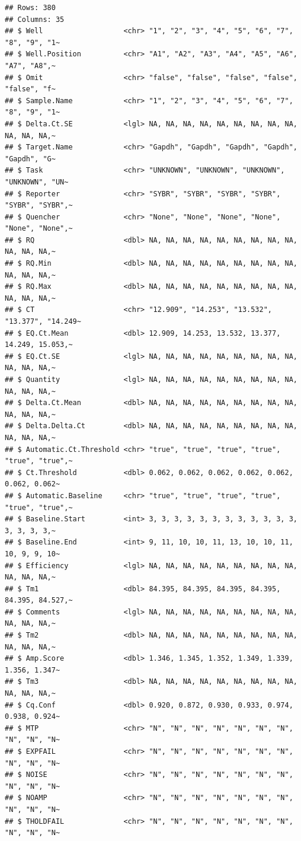 \documentclass[
]{book}
\begin{document}
\begin{verbatim}
## Rows: 380
## Columns: 35
## $ Well                   <chr> "1", "2", "3", "4", "5", "6", "7", "8", "9", "1~
## $ Well.Position          <chr> "A1", "A2", "A3", "A4", "A5", "A6", "A7", "A8",~
## $ Omit                   <chr> "false", "false", "false", "false", "false", "f~
## $ Sample.Name            <chr> "1", "2", "3", "4", "5", "6", "7", "8", "9", "1~
## $ Delta.Ct.SE            <lgl> NA, NA, NA, NA, NA, NA, NA, NA, NA, NA, NA, NA,~
## $ Target.Name            <chr> "Gapdh", "Gapdh", "Gapdh", "Gapdh", "Gapdh", "G~
## $ Task                   <chr> "UNKNOWN", "UNKNOWN", "UNKNOWN", "UNKNOWN", "UN~
## $ Reporter               <chr> "SYBR", "SYBR", "SYBR", "SYBR", "SYBR", "SYBR",~
## $ Quencher               <chr> "None", "None", "None", "None", "None", "None",~
## $ RQ                     <dbl> NA, NA, NA, NA, NA, NA, NA, NA, NA, NA, NA, NA,~
## $ RQ.Min                 <dbl> NA, NA, NA, NA, NA, NA, NA, NA, NA, NA, NA, NA,~
## $ RQ.Max                 <dbl> NA, NA, NA, NA, NA, NA, NA, NA, NA, NA, NA, NA,~
## $ CT                     <chr> "12.909", "14.253", "13.532", "13.377", "14.249~
## $ EQ.Ct.Mean             <dbl> 12.909, 14.253, 13.532, 13.377, 14.249, 15.053,~
## $ EQ.Ct.SE               <lgl> NA, NA, NA, NA, NA, NA, NA, NA, NA, NA, NA, NA,~
## $ Quantity               <lgl> NA, NA, NA, NA, NA, NA, NA, NA, NA, NA, NA, NA,~
## $ Delta.Ct.Mean          <dbl> NA, NA, NA, NA, NA, NA, NA, NA, NA, NA, NA, NA,~
## $ Delta.Delta.Ct         <dbl> NA, NA, NA, NA, NA, NA, NA, NA, NA, NA, NA, NA,~
## $ Automatic.Ct.Threshold <chr> "true", "true", "true", "true", "true", "true",~
## $ Ct.Threshold           <dbl> 0.062, 0.062, 0.062, 0.062, 0.062, 0.062, 0.062~
## $ Automatic.Baseline     <chr> "true", "true", "true", "true", "true", "true",~
## $ Baseline.Start         <int> 3, 3, 3, 3, 3, 3, 3, 3, 3, 3, 3, 3, 3, 3, 3, 3,~
## $ Baseline.End           <int> 9, 11, 10, 10, 11, 13, 10, 10, 11, 10, 9, 9, 10~
## $ Efficiency             <lgl> NA, NA, NA, NA, NA, NA, NA, NA, NA, NA, NA, NA,~
## $ Tm1                    <dbl> 84.395, 84.395, 84.395, 84.395, 84.395, 84.527,~
## $ Comments               <lgl> NA, NA, NA, NA, NA, NA, NA, NA, NA, NA, NA, NA,~
## $ Tm2                    <dbl> NA, NA, NA, NA, NA, NA, NA, NA, NA, NA, NA, NA,~
## $ Amp.Score              <dbl> 1.346, 1.345, 1.352, 1.349, 1.339, 1.356, 1.347~
## $ Tm3                    <dbl> NA, NA, NA, NA, NA, NA, NA, NA, NA, NA, NA, NA,~
## $ Cq.Conf                <dbl> 0.920, 0.872, 0.930, 0.933, 0.974, 0.938, 0.924~
## $ MTP                    <chr> "N", "N", "N", "N", "N", "N", "N", "N", "N", "N~
## $ EXPFAIL                <chr> "N", "N", "N", "N", "N", "N", "N", "N", "N", "N~
## $ NOISE                  <chr> "N", "N", "N", "N", "N", "N", "N", "N", "N", "N~
## $ NOAMP                  <chr> "N", "N", "N", "N", "N", "N", "N", "N", "N", "N~
## $ THOLDFAIL              <chr> "N", "N", "N", "N", "N", "N", "N", "N", "N", "N~
\end{verbatim}
\end{document}
